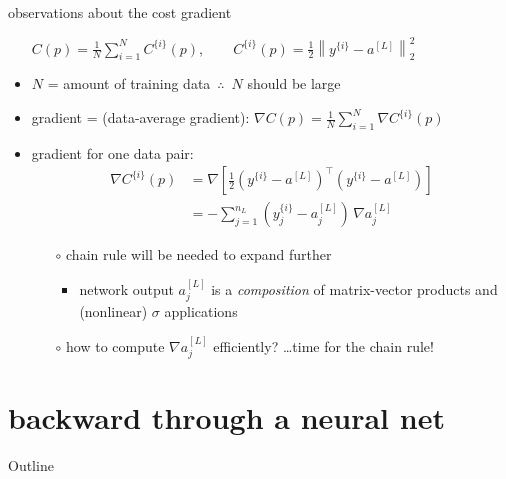 \documentclass[xcolor={svgnames},
               hyperref={colorlinks,citecolor=DeepPink4,linkcolor=FireBrick,urlcolor=Maroon}]
               {beamer}
\newcommand{\grad}{\nabla}
\begin{document}
\begin{frame}{observations about the cost gradient}

\begin{itemize}
\item[] \qquad \small $\displaystyle C(p) = \frac{1}{N} \sum_{i=1}^N C^{\{i\}}(p), \qquad C^{\{i\}}(p) = \frac{1}{2} \left\|y^{\{i\}} - a^{[L]}\right\|_2^2$ \normalsize

\medskip
\item $N$ = amount of training data\, $\therefore$\, $N$ should be large
\item gradient = (data-average gradient): \quad \small $\displaystyle \grad C(p) = \frac{1}{N} \sum_{i=1}^N \grad C^{\{i\}}(p)$ \normalsize
\item gradient for one data pair:
\begin{align*}
\grad C^{\{i\}}(p) &= \grad\left[\frac{1}{2} (y^{\{i\}} - a^{[L]})^\top (y^{\{i\}} - a^{[L]})\right] \\
    &= - \sum_{j=1}^{n_L} (y_j^{\{i\}} - a^{[L]}_j)\, \grad a^{[L]}_j
\end{align*}

    \begin{itemize}
    \item[$\circ$] chain rule will be needed to expand further
        \begin{itemize}
        \item network output $a_j^{[L]}$ is a \emph{composition} of matrix-vector products and (nonlinear) $\sigma$ applications
        \end{itemize}
    \item[$\circ$] how to compute $\grad a^{[L]}_j$ efficiently? \dots time for the chain rule!
    \end{itemize}
\end{itemize}
\end{frame}


\section{backward through a neural net}

\begin{frame}{Outline}
\end{frame}
\end{document}
